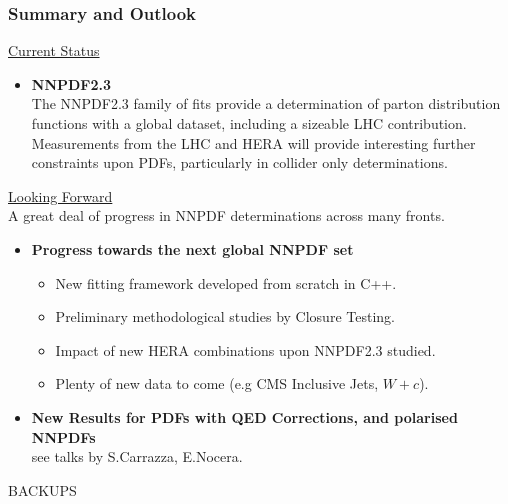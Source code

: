 \documentclass[10pt]{beamer}
\begin{document}
\begin{frame}
\frametitle{Summary and Outlook}




\underline{Current Status}

\begin{itemize}
	\item<1-> \textbf{NNPDF2.3}\\
	{ \small The NNPDF2.3 family of fits provide a determination of parton distribution functions with a global dataset, including a sizeable LHC contribution. }
	\vskip10pt
	{\small Measurements from the LHC and HERA will provide interesting further constraints upon PDFs, particularly in collider only determinations.}
\end{itemize}
\vskip10pt

\underline{Looking Forward}\\
A great deal of progress in NNPDF determinations across many fronts.
\begin{itemize}
	\item<1-> \textbf{Progress towards the next global NNPDF set}\\

	\begin{itemize}
	\item<1-> New fitting framework developed from scratch in C++.
	\item<1-> Preliminary methodological studies by Closure Testing.
	\item<1-> Impact of new HERA combinations upon NNPDF2.3 studied.
	\item<1-> Plenty of new data to come (e.g CMS Inclusive Jets, $W+c$).
	\end{itemize}

	\item<1-> \textbf{New Results for PDFs with QED Corrections, and polarised NNPDFs}\\
	{ \small  see talks by S.Carrazza, E.Nocera.}
\end{itemize}


\end{frame}

\begin{frame}
    \begin{center}
      BACKUPS
    \end{center}
\end{frame}
\end{document}

